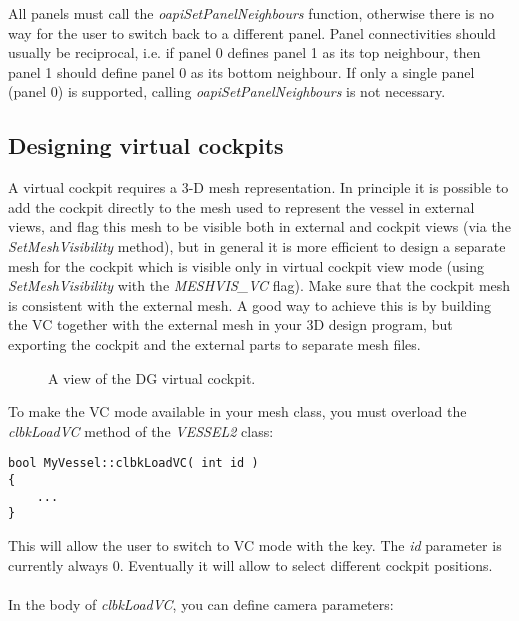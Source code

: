 \documentclass[Orbiter Developer Manual.tex]{subfiles}
\begin{document}

All panels must call the \textit{oapiSetPanelNeighbours} function, otherwise there is no way for the user to switch back to a different panel. Panel connectivities should usually be reciprocal, i.e. if panel 0 defines panel 1 as its top neighbour, then panel 1 should define panel 0 as its bottom neighbour. If only a single panel (panel 0) is supported, calling \textit{oapiSetPanelNeighbours} is not necessary.


\subsection{Designing virtual cockpits}
\label{ssec:vc_design}
A virtual cockpit requires a 3-D mesh representation. In principle it is possible to add the cockpit directly to the mesh used to represent the vessel in external views, and flag this mesh to be visible both in external and cockpit views (via the \textit{SetMeshVisibility} method), but in general it is more efficient to design a separate mesh for the cockpit which is visible only in virtual cockpit view mode (using \textit{SetMeshVisibility} with the \textit{MESHVIS\_VC} flag). Make sure that the cockpit mesh is consistent with the external mesh. A good way to achieve this is by building the VC together with the external mesh in your 3D design program, but exporting the cockpit and the external parts to separate mesh files.

\begin{figure}[H]
	\centering
	\caption{A view of the DG virtual cockpit.}
\end{figure}

\noindent
To make the VC mode available in your mesh class, you must overload the \textit{clbkLoadVC} method of the \textit{VESSEL2} class:

\begin{lstlisting}
bool MyVessel::clbkLoadVC( int id )
{
	...
}
\end{lstlisting}

\noindent
This will allow the user to switch to VC mode with the  key. The \textit{id} parameter is currently always 0. Eventually it will allow to select different cockpit positions.\\
\\
In the body of \textit{clbkLoadVC}, you can define camera parameters:
\end{document}
